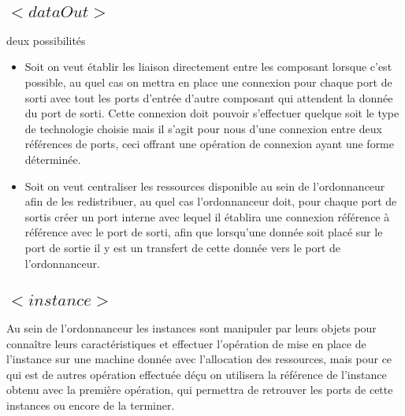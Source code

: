 \documentclass{article}
\begin{document}
    \subsection{$<dataOut>$}
    deux possibilités
    \begin{itemize}
            \item Soit on veut établir les liaison directement entre les composant lorsque c'est possible, au quel cas on mettra en place une connexion pour chaque port de sorti avec tout les ports d'entrée d'autre composant qui attendent la donnée du port de sorti. Cette connexion doit pouvoir s'effectuer quelque soit le type de technologie choisie mais il s'agit pour nous d'une connexion entre deux références de ports, ceci offrant une opération de connexion ayant une forme déterminée.
            \item Soit on veut centraliser les ressources disponible au sein de l'ordonnanceur afin de les redistribuer, au quel cas l'ordonnanceur doit, pour chaque port de sortis créer un port interne avec lequel il établira une connexion référence à référence avec le port de sorti, afin que lorsqu'une donnée soit placé sur le port de sortie il y est un transfert de cette donnée vers le port de l'ordonnanceur.
        \end{itemize}

    \subsection{$<instance>$}
    Au sein de l'ordonnanceur les instances sont manipuler par leurs objets pour connaître leurs caractéristiques et effectuer l'opération de mise en place de l'instance sur une machine donnée avec l'allocation des ressources, mais pour ce qui est de autres opération effectuée déçu on utilisera la référence de l'instance obtenu avec la première opération, qui permettra de retrouver les ports de cette instances ou encore de la terminer.
\end{document}
